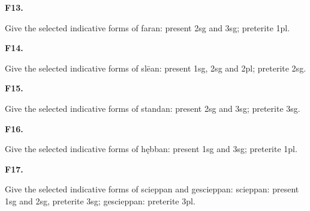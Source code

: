 \par\begin{minipage}{\linewidth}\raggedright
\textbf{F13.}

Give the selected indicative forms of faran: present 2sg and 3sg; preterite 1pl.

\end{minipage}\par\addvspace{4pt}

\par\begin{minipage}{\linewidth}\raggedright
\textbf{F14.}

Give the selected indicative forms of slēan: present 1sg, 2sg and 2pl; preterite 2sg.

\end{minipage}\par\addvspace{4pt}

\par\begin{minipage}{\linewidth}\raggedright
\textbf{F15.}

Give the selected indicative forms of standan: present 2sg and 3sg; preterite 3sg.

\end{minipage}\par\addvspace{4pt}

\par\begin{minipage}{\linewidth}\raggedright
\textbf{F16.}

Give the selected indicative forms of hębban: present 1sg and 3sg; preterite 1pl.

\end{minipage}\par\addvspace{4pt}

\par\begin{minipage}{\linewidth}\raggedright
\textbf{F17.}

Give the selected indicative forms of scieppan and gescieppan: scieppan: present 1sg and 2sg, preterite 3sg; gescieppan: preterite 3pl.

\end{minipage}\par\addvspace{4pt}

